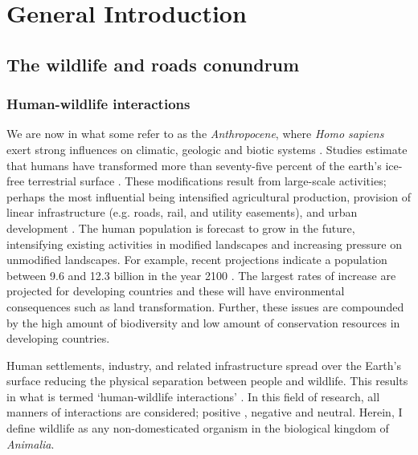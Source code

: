 \chapter{General Introduction}\label{sec:intro}
\newpage

\section{The wildlife and roads conundrum}

\subsection{Human-wildlife interactions}

We are now in what some refer to as the \textit{Anthropocene}, where \textit{Homo sapiens} exert strong influences on climatic, geologic and biotic systems \citep{crut06}. Studies estimate that humans have transformed more than seventy-five percent of the earth's ice-free terrestrial surface \citep[e.g.][]{elli08}. These modifications result from large-scale activities; perhaps the most influential being intensified agricultural production, provision of linear infrastructure (e.g. roads, rail, and utility easements), and urban development \citep{vito97,sand02,fole05}. The human population is forecast to grow in the future, intensifying existing activities in modified landscapes and increasing pressure on unmodified landscapes. For example, recent projections indicate a population between 9.6 and 12.3 billion in the year 2100 \citep{gerl14}. The largest rates of increase are projected for developing countries and these will have environmental consequences such as land transformation. Further, these issues are compounded by the high amount of biodiversity and low amount of conservation resources in developing countries. 

Human settlements, industry, and related infrastructure spread over the Earth's surface reducing the physical separation between people and wildlife. This results in what is termed `human-wildlife interactions' \citep[see][]{manf08}. In this field of research, all manners of interactions are considered; positive \citep[e.g. psychological well-being, see][]{dall12}, negative \citep[e.g. swooping birds, see][]{jone99} and neutral. Herein, I define wildlife as any non-domesticated organism in the biological kingdom of \textit{Animalia}. 

